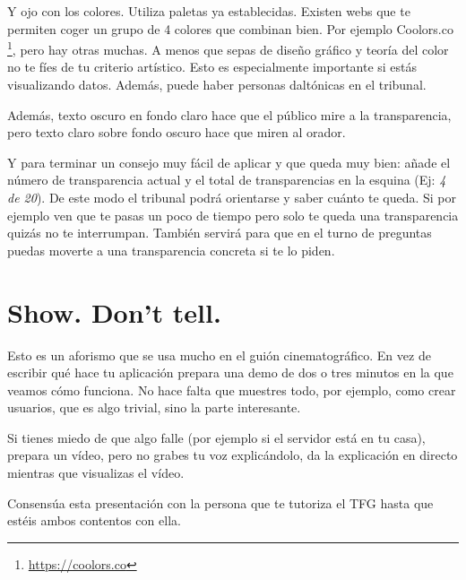 Y ojo con los colores. Utiliza paletas ya establecidas. Existen webs que te permiten coger un grupo de 4 colores que combinan bien. Por ejemplo Coolors.co \footnote{\url{https://coolors.co}}, pero hay otras muchas. A menos que sepas de diseño gráfico y teoría del color no te fíes de tu criterio artístico. Esto es especialmente importante si estás visualizando datos. Además, puede haber personas daltónicas en el tribunal.

Además, texto oscuro en fondo claro hace que el público mire a la transparencia, pero texto claro sobre fondo oscuro hace que miren al orador.

Y para terminar un consejo muy fácil de aplicar y que queda muy bien: añade el número de transparencia actual y el total de transparencias en la esquina (Ej: \textit{4 de 20}). De este modo el tribunal podrá orientarse y saber cuánto te queda. Si por ejemplo ven que te pasas un poco de tiempo pero solo te queda una transparencia quizás no te interrumpan. También servirá para que en el turno de preguntas puedas moverte a una transparencia concreta si te lo piden.

\section{Show. Don't tell.}

Esto es un aforismo que se usa mucho en el guión cinematográfico. En vez de escribir qué hace tu aplicación prepara una demo de dos o tres minutos en la que veamos cómo funciona. No hace falta que muestres todo, por ejemplo, como crear usuarios, que es algo trivial, sino la parte interesante.

Si tienes miedo de que algo falle (por ejemplo si el servidor está en tu casa), prepara un vídeo, pero no grabes tu voz explicándolo, da la explicación en directo mientras que visualizas el vídeo.

Consensúa esta presentación con la persona que te tutoriza el TFG hasta que estéis ambos contentos con ella.
